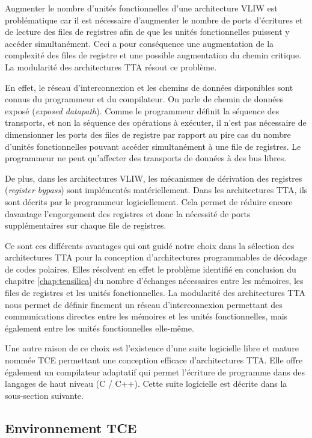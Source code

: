 Augmenter le nombre d'unités fonctionnelles d'une architecture VLIW est problématique car il est nécessaire d'augmenter le nombre de ports d'écritures et de lecture des files de registres afin de que les unités fonctionnelles puissent y accéder simultanément. Ceci a pour conséquence une augmentation de la complexité des files de registre et une possible augmentation du chemin critique.
La modularité des architectures TTA résout ce problème.

En effet, le réseau d'interconnexion et les chemins de données disponibles sont connus du programmeur et du compilateur. On parle de \og chemin de données exposé \fg (\textit{exposed datapath}). Comme le programmeur définit la séquence des transports, et non la séquence des opérations à exécuter, il n'est pas nécessaire de dimensionner les ports des files de registre par rapport au pire cas du nombre d'unités fonctionnelles pouvant accéder simultanément à une file de registres. Le programmeur ne peut qu'affecter des transports de données à des bus libres.

De plus, dans les architectures VLIW, les mécanismes de dérivation des registres (\textit{register bypass}) sont implémentés matériellement. Dans les architectures TTA, ils sont décrits par le programmeur logiciellement. Cela permet de réduire encore davantage l'engorgement des registres et donc la nécessité de ports supplémentaires sur chaque file de registres.

Ce sont ces différents avantages qui ont guidé notre choix dans la sélection des architectures TTA pour la conception d'architectures programmables de décodage de codes polaires. Elles résolvent en effet le problème identifié en conclusion du chapitre \ref{chap:tensilica} du nombre d'échanges nécessaires entre les mémoires, les files de registres et les unités fonctionnelles. La modularité des architectures TTA nous permet de définir finement un réseau d'interconnexion permettant des communications directes entre les mémoires et les unités fonctionnelles, mais également entre les unités fonctionnelles elle-même.

Une autre raison de ce choix est l'existence d'une suite logicielle libre et mature nommée TCE permettant une conception efficace d'architectures TTA. Elle offre également un compilateur adaptatif qui permet l'écriture de programme dans des langages de haut niveau (C / C++). Cette suite logicielle est décrite dans la sous-section suivante.


\subsection{Environnement TCE}

